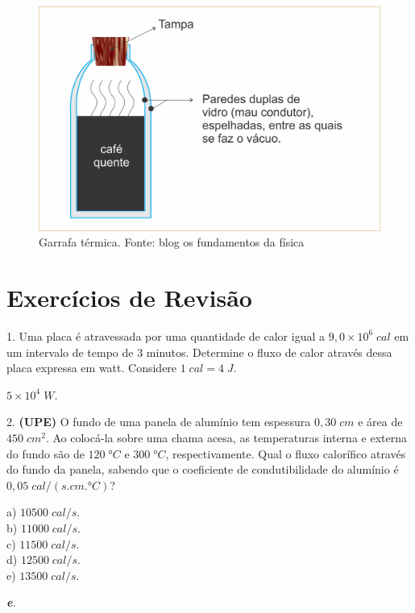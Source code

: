\documentclass[12pt,twoside]{article}
\newenvironment{resposta*}
{\bf Resposta:\\ }
{}
\begin{document}
\begin{figure}[ht]{}
\centering\includegraphics[width=2.5truein]{garrafa-termica.png}
\caption{Garrafa térmica. Fonte: blog os fundamentos da física}

\end{figure}

\hypertarget{x-exercícios-de-revisão}{\section{Exercícios de Revisão}}
1. Uma placa é atravessada por uma quantidade de calor igual a $9,0\times 10^{6}\;cal$ em um intervalo de tempo de $3$ minutos. Determine o fluxo de calor através dessa placa expressa em watt. Considere $1\;cal=4\;J$.


\begin{resposta*}
{\it $5\times 10^{4}\;W$.}
\end{resposta*}

2. \textbf{(UPE)} O fundo de uma panela de alumínio tem espessura $0,30\;cm$ e área de $450\;cm^{2}$. Ao colocá-la sobre uma chama acesa, as temperaturas interna e externa do fundo são de $120\;°C$ e $300\;°C$, respectivamente. Qual o fluxo calorífico através do fundo da panela, sabendo que o coeficiente de condutibilidade do alumínio é $0,05\;cal/(s.cm.°C)$?


a) $10500\;cal/s$. \\
b) $11000\;cal/s$. \\
c) $11500\;cal/s$. \\
d) $12500\;cal/s$. \\
e) $13500\;cal/s$.


\begin{resposta*}
{\it \textbf{e}.}
\end{resposta*}
\end{document}
